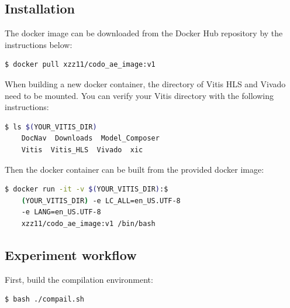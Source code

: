 \documentclass[conference]{IEEEtran}
\begin{document}


\subsection{Installation}
The docker image can be downloaded from the Docker Hub repository by the instructions below: 
\begin{lstlisting}[language=bash]
  $ docker pull xzz11/codo_ae_image:v1
\end{lstlisting}
When building a new docker container, the directory of Vitis HLS and Vivado need to be mounted.  You can verify your Vitis directory with the following instructions:
\begin{lstlisting}[language=bash]
  $ ls $(YOUR_VITIS_DIR)
    DocNav  Downloads  Model_Composer  
    Vitis  Vitis_HLS  Vivado  xic
\end{lstlisting}
Then the docker container can be built from the provided docker image: 
\begin{lstlisting}[language=bash]
  $ docker run -it -v $(YOUR_VITIS_DIR):$
    (YOUR_VITIS_DIR) -e LC_ALL=en_US.UTF-8 
    -e LANG=en_US.UTF-8 
    xzz11/codo_ae_image:v1 /bin/bash
\end{lstlisting}


\subsection{Experiment workflow}
First, build the compilation environment:
\begin{lstlisting}[language=bash]
$ bash ./compail.sh
\end{lstlisting}
\end{document}
